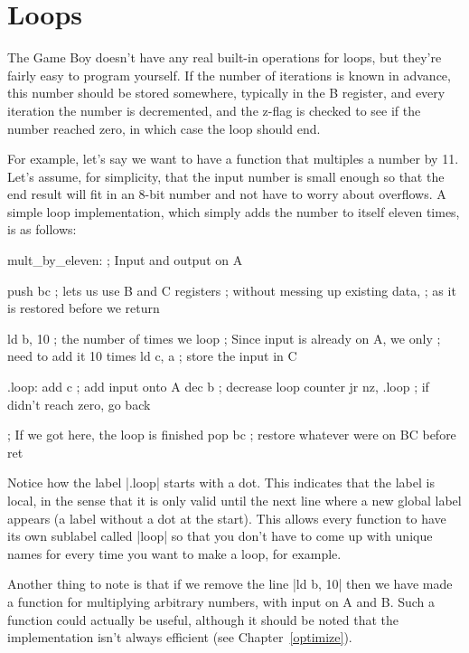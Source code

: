 \documentclass[11pt]{book}
\begin{document}
\section{Loops} 
\label{loops}
The Game Boy doesn't have any real built-in operations for loops, but they're fairly easy to program yourself. If the number of iterations is known in advance, this number should be stored somewhere, typically in the B register, and every iteration the number is decremented, and the z-flag is checked to see if the number reached zero, in which case the loop should end. 

For example, let's say we want to have a function that multiples a number by 11. Let's assume, for simplicity, that the input number is small enough so that the end result will fit in an 8-bit number and not have to worry about overflows. A simple loop implementation, which simply adds the number to itself eleven times, is as follows:

\begin{code}
mult_by_eleven:
  ; Input and output on A 
  
  push bc ; lets us use B and C registers
  ; without messing up existing data, 
  ; as it is restored before we return 
  
  ld b, 10 ; the number of times we loop
  ; Since input is already on A, we only 
  ; need to add it 10 times 
  ld c, a ; store the input in C
  
.loop:
  add c ; add input onto A 
  dec b ; decrease loop counter 
  jr nz, .loop ; if didn't reach zero, go back
  
  ; If we got here, the loop is finished 
  pop bc ; restore whatever were on BC before 
  ret 
\end{code}
  
Notice how the label |.loop| starts with a dot. This indicates that the label is local, in the sense that it is only valid until the next line where a new global label appears (a label without a dot at the start). This allows every function to have its own sublabel called |loop| so that you don't have to come up with unique names for every time you want to make a loop, for example.

Another thing to note is that if we remove the line |ld b, 10| then we have made a function for multiplying arbitrary numbers, with input on A and B. Such a function could actually be useful, although it should be noted that the implementation isn't always efficient (see Chapter~\ref{optimize}).
\end{document}
